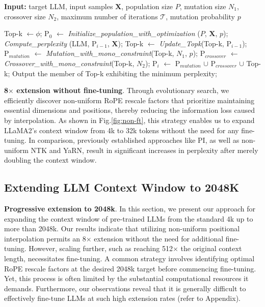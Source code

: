\begin{algorithm}[t]
	\small
	\caption{The search algorithm}
	\textbf{Input:} target LLM, input samples $\mathbf{X}$, population size $P$, mutation size $N_1$, crossover size $N_2$, maximum number of iterations $\mathcal{T}$, mutation probability $p$\\

	\begin{algorithmic}[1]
		\label{alg:search}
		\STATE Top-k $\leftarrow \phi$;	
		\STATE $\text{P}_0$ $\leftarrow$ \textit{Initialize\_population\_with\_optimization} ($P$, $\mathbf{X}$, $p$);
		\STATE \textit{Compute\_perplexity} (LLM, $\text{P}_{i-1}$, $\mathbf{X}$);
		\STATE Top-k $\leftarrow$ \textit{Update\_Topk}(Top-k, $\text{P}_{i-1}$);
		\STATE $\text{P}_{mutation}$ $\leftarrow$ \textit{Mutation\_with\_mono\_constraint}(Top-k, $N_1$, $p$); 
		\STATE $\text{P}_{crossover}$ $\leftarrow$ \textit{Crossover\_with\_mono\_constraint}(Top-k, $N_2$);
		\STATE $\text{P}_i$ $\leftarrow$ $\text{P}_{mutation}$ $\cup$ $\text{P}_{crossover}$ $\cup$ Top-k;
		\ENDFOR
		\STATE Output the member of Top-k exhibiting the minimum perplexity;
	\end{algorithmic}
\end{algorithm}

\textbf{8$\times$ extension without fine-tuning}. Through evolutionary search, we efficiently discover non-uniform RoPE rescale factors that prioritize maintaining essential dimensions and positions, thereby reducing the information loss caused by interpolation. As shown in Fig.\ref{fig:non-ft}, this strategy enables us to expand LLaMA2's context window from 4k to 32k tokens without the need for any fine-tuning. In comparison, previously established approaches like PI, as well as non-uniform NTK and YaRN, result in significant increases in perplexity after merely doubling the context window.

\subsection{Extending LLM Context Window to 2048K}
\label{sec:extendto2048k}

\textbf{Progressive extension to 2048k}. In this section, we present our approach for expanding the context window of pre-trained LLMs from the standard 4k up to more than 2048k. Our results indicate that utilizing non-uniform positional interpolation permits an 8$\times$ extension without the need for additional fine-tuning. However, scaling further, such as reaching 512$\times$ the original context length, necessitates fine-tuning. A common strategy involves identifying optimal RoPE rescale factors at the desired 2048k target before commencing fine-tuning. Yet, this process is often limited by the substantial computational resources it demands. Furthermore, our observations reveal that it is generally difficult to effectively fine-tune LLMs at such high extension rates (refer to Appendix).

